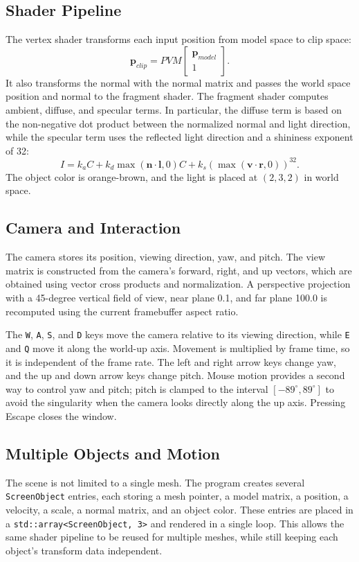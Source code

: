 \documentclass[acmtog]{acmart}
\begin{document}
  \subsection{Shader Pipeline}
  The vertex shader transforms each input position from model space to clip
  space:
  \[
    \boldsymbol{p}_{clip}
    = P V M
      \begin{bmatrix}\boldsymbol{p}_{model}\\1\end{bmatrix}.
  \]
  It also transforms the normal with the normal matrix and passes the world
  space position and normal to the fragment shader.  The fragment shader
  computes ambient, diffuse, and specular terms.  In particular, the diffuse
  term is based on the non-negative dot product between the normalized normal
  and light direction, while the specular term uses the reflected light
  direction and a shininess exponent of 32:
  \[
    I = k_a C +
        k_d \max(\boldsymbol{n}\cdot\boldsymbol{l},0)C +
        k_s \left(\max(\boldsymbol{v}\cdot\boldsymbol{r},0)\right)^{32}.
  \]
  The object color is orange-brown, and the light is placed at
  $(2,3,2)$ in world space.

  \subsection{Camera and Interaction}
  The camera stores its position, viewing direction, yaw, and pitch.  The view
  matrix is constructed from the camera's forward, right, and up vectors, which
  are obtained using vector cross products and normalization.  A perspective
  projection with a 45-degree vertical field of view, near plane 0.1, and far
  plane 100.0 is recomputed using the current framebuffer aspect ratio.

  The \texttt{W}, \texttt{A}, \texttt{S}, and \texttt{D} keys move the camera
  relative to its viewing direction, while \texttt{E} and \texttt{Q} move it
  along the world-up axis.  Movement is multiplied by frame time, so it is
  independent of the frame rate.  The left and right arrow keys change yaw,
  and the up and down arrow keys change pitch.  Mouse motion provides a second
  way to control yaw and pitch; pitch is clamped to the interval
  $[-89^\circ,89^\circ]$ to avoid the singularity when the camera looks
  directly along the up axis.  Pressing Escape closes the window.

  \subsection{Multiple Objects and Motion}
  The scene is not limited to a single mesh.  The program creates several
  \texttt{ScreenObject} entries, each storing a mesh pointer, a model matrix,
  a position, a velocity, a scale, a normal matrix, and an object color.  These
  entries are placed in a \texttt{std::array<ScreenObject, 3>} and rendered in a
  single loop.  This allows the same shader pipeline to be reused for multiple
  meshes, while still keeping each object's transform data independent.
\end{document}
